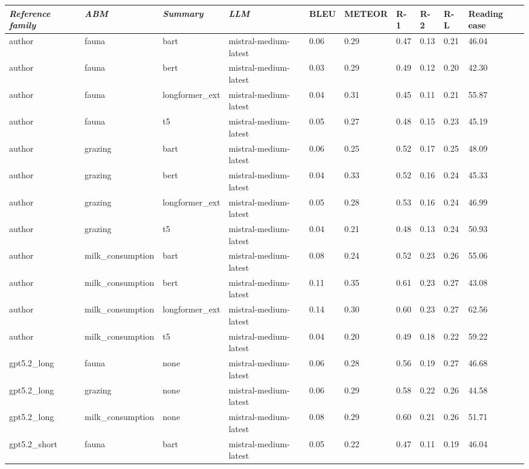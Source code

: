 \begin{tabular}{|l|l|l|l|l|l|l|l|l|l|}
\hline
\textit{\textbf{Reference family}} & \textit{\textbf{ABM}} & \textit{\textbf{Summary}} & \textit{\textbf{LLM}} & BLEU & METEOR & R-1 & R-2 & R-L & Reading ease \\
 \hline
 author & fauna & bart & mistral-medium-latest & 0.06 & 0.29 & 0.47 & 0.13 & 0.21 & 46.04 \\
 \hline
 author & fauna & bert & mistral-medium-latest & 0.03 & 0.29 & 0.49 & 0.12 & 0.20 & 42.30 \\
 \hline
 author & fauna & longformer\_ext & mistral-medium-latest & 0.04 & 0.31 & 0.45 & 0.11 & 0.21 & 55.87 \\
 \hline
 author & fauna & t5 & mistral-medium-latest & 0.05 & 0.27 & 0.48 & 0.15 & 0.23 & 45.19 \\
 \hline
 author & grazing & bart & mistral-medium-latest & 0.06 & 0.25 & 0.52 & 0.17 & 0.25 & 48.09 \\
 \hline
 author & grazing & bert & mistral-medium-latest & 0.04 & 0.33 & 0.52 & 0.16 & 0.24 & 45.33 \\
 \hline
 author & grazing & longformer\_ext & mistral-medium-latest & 0.05 & 0.28 & 0.53 & 0.16 & 0.24 & 46.99 \\
 \hline
 author & grazing & t5 & mistral-medium-latest & 0.04 & 0.21 & 0.48 & 0.13 & 0.24 & 50.93 \\
 \hline
 author & milk\_consumption & bart & mistral-medium-latest & 0.08 & 0.24 & 0.52 & 0.23 & 0.26 & 55.06 \\
 \hline
 author & milk\_consumption & bert & mistral-medium-latest & 0.11 & 0.35 & 0.61 & 0.23 & 0.27 & 43.08 \\
 \hline
 author & milk\_consumption & longformer\_ext & mistral-medium-latest & 0.14 & 0.30 & 0.60 & 0.23 & 0.27 & 62.56 \\
 \hline
 author & milk\_consumption & t5 & mistral-medium-latest & 0.04 & 0.20 & 0.49 & 0.18 & 0.22 & 59.22 \\
 \hline
 gpt5.2\_long & fauna & none & mistral-medium-latest & 0.06 & 0.28 & 0.56 & 0.19 & 0.27 & 46.68 \\
 \hline
 gpt5.2\_long & grazing & none & mistral-medium-latest & 0.06 & 0.29 & 0.58 & 0.22 & 0.26 & 44.58 \\
 \hline
 gpt5.2\_long & milk\_consumption & none & mistral-medium-latest & 0.08 & 0.29 & 0.60 & 0.21 & 0.26 & 51.71 \\
 \hline
 gpt5.2\_short & fauna & bart & mistral-medium-latest & 0.05 & 0.22 & 0.47 & 0.11 & 0.19 & 46.04 \\

\end{tabular}
